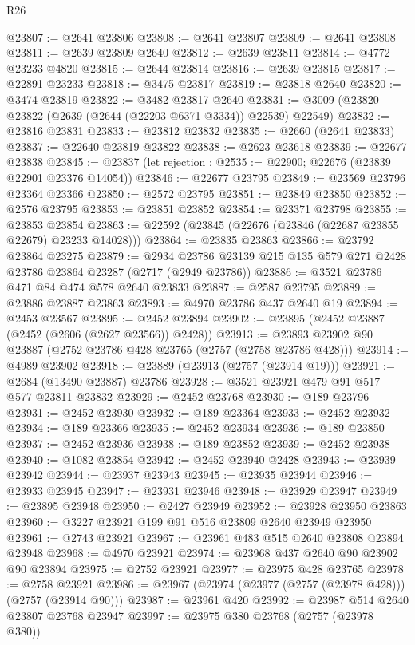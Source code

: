 \begin{lexlean}{R26}
\begin{coremodule}
@23807 := @2641 @23806
@23808 := @2641 @23807
@23809 := @2641 @23808
@23811 := @2639 @23809 @2640
@23812 := @2639 @23811
@23814 := @4772 @23233 @4820
@23815 := @2644 @23814
@23816 := @2639 @23815
@23817 := @22891 @23233
@23818 := @3475 @23817
@23819 := @23818 @2640
@23820 := @3474 @23819
@23822 := @3482 @23817 @2640
@23831 := @3009 (@23820 @23822 (@2639 (@2644 (@22203 @6371 @3334)) @22539) @22549)
@23832 := @23816 @23831
@23833 := @23812 @23832
@23835 := @2660 (@2641 @23833)
@23837 := @22640 @23819 @23822
@23838 := @2623 @23618
@23839 := @22677 @23838
@23845 := @23837 (let rejection : @2535 := @22900; @22676 (@23839 @22901 @23376 @14054))
@23846 := @22677 @23795
@23849 := @23569 @23796 @23364 @23366
@23850 := @2572 @23795
@23851 := @23849 @23850
@23852 := @2576 @23795
@23853 := @23851 @23852
@23854 := @23371 @23798
@23855 := @23853 @23854
@23863 := @22592 (@23845 (@22676 (@23846 (@22687 @23855 @22679) @23233 @14028)))
@23864 := @23835 @23863
@23866 := @23792 @23864 @23275
@23879 := @2934 @23786 @23139 @215 @135 @579 @271 @2428 @23786 @23864 @23287 (@2717 (@2949 @23786))
@23886 := @3521 @23786 @471 @84 @474 @578 @2640 @23833
@23887 := @2587 @23795
@23889 := @23886 @23887 @23863
@23893 := @4970 @23786 @437 @2640 @19
@23894 := @2453 @23567
@23895 := @2452 @23894
@23902 := @23895 (@2452 @23887 (@2452 (@2606 (@2627 @23566)) @2428))
@23913 := @23893 @23902 @90 @23887 (@2752 @23786 @428 @23765 (@2757 (@2758 @23786 @428)))
@23914 := @4989 @23902
@23918 := @23889 (@23913 (@2757 (@23914 @19)))
@23921 := @2684 (@13490 @23887) @23786
@23928 := @3521 @23921 @479 @91 @517 @577 @23811 @23832
@23929 := @2452 @23768
@23930 := @189 @23796
@23931 := @2452 @23930
@23932 := @189 @23364
@23933 := @2452 @23932
@23934 := @189 @23366
@23935 := @2452 @23934
@23936 := @189 @23850
@23937 := @2452 @23936
@23938 := @189 @23852
@23939 := @2452 @23938
@23940 := @1082 @23854
@23942 := @2452 @23940 @2428
@23943 := @23939 @23942
@23944 := @23937 @23943
@23945 := @23935 @23944
@23946 := @23933 @23945
@23947 := @23931 @23946
@23948 := @23929 @23947
@23949 := @23895 @23948
@23950 := @2427 @23949
@23952 := @23928 @23950 @23863
@23960 := @3227 @23921 @199 @91 @516 @23809 @2640 @23949 @23950
@23961 := @2743 @23921
@23967 := @23961 @483 @515 @2640 @23808 @23894 @23948
@23968 := @4970 @23921
@23974 := @23968 @437 @2640 @90 @23902 @90 @23894
@23975 := @2752 @23921
@23977 := @23975 @428 @23765
@23978 := @2758 @23921
@23986 := @23967 (@23974 (@23977 (@2757 (@23978 @428))) (@2757 (@23914 @90)))
@23987 := @23961 @420
@23992 := @23987 @514 @2640 @23807 @23768 @23947
@23997 := @23975 @380 @23768 (@2757 (@23978 @380))

\end{coremodule}
\end{lexlean}
